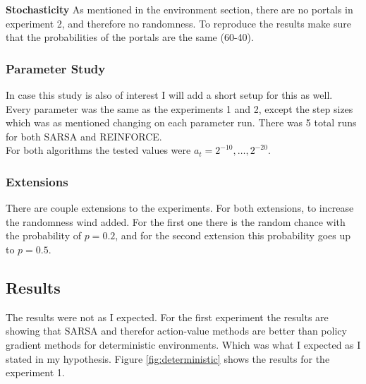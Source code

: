 \documentclass[10pt, letterpaper, twocolumn]{article}
\begin{document}
	\noindent \textbf{Stochasticity} As mentioned in the environment section, there are no portals in experiment 2, and therefore no randomness. To reproduce the results make sure that the probabilities of the portals are the same (60-40).
	
	\subsubsection{Parameter Study}
	
	\noindent In case this study is also of interest I will add a short setup for this as well. \\
	
	\noindent Every parameter was the same as the experiments 1 and 2, except the step sizes which was as mentioned changing on each parameter run. There was 5 total runs for both SARSA and REINFORCE. \\
	
	\noindent For both algorithms the tested values were $a_t = {2^{-10},\ldots,2^{-20}}$.\\
	
	\subsubsection{Extensions}
	
	\noindent There are couple extensions to the experiments. For both extensions, to increase the randomness wind added. For the first one there is the random chance with the probability of $p = 0.2$, and for the second extension this probability goes up to $p = 0.5$.

	\subsection{Results}
	
	The results were not as I expected. For the first experiment the results are showing that SARSA and therefor action-value methods are better than policy gradient methods for deterministic environments. Which was what I expected as I stated in my hypothesis. Figure \ref{fig:deterministic} shows the results for the experiment 1. 
	
\end{document}
